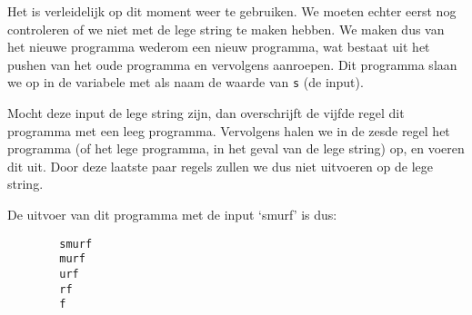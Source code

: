 \begin{exmp}
	Het is verleidelijk op dit moment weer  te gebruiken. We
	moeten echter eerst nog controleren of we niet met de lege string te maken
	hebben. We maken dus van het nieuwe programma wederom een nieuw programma,
	wat bestaat uit het pushen van het oude programma en vervolgens
	 aanroepen. Dit programma slaan we op in de variabele met als
	naam de waarde van \verb$s$ (de input).

	Mocht deze input de lege string zijn, dan overschrijft de vijfde regel dit
	programma met een leeg programma. Vervolgens halen we in de zesde regel het
	programma (of het lege programma, in het geval van de lege string) op, en
	voeren dit uit. Door deze laatste paar regels zullen we dus niet
	 uitvoeren op de lege string.

	\medskip
	De uitvoer van dit programma met de input `smurf' is dus:

	\begin{verbatim}
		smurf
		murf
		urf
		rf
		f

	\end{verbatim}
\end{exmp}

